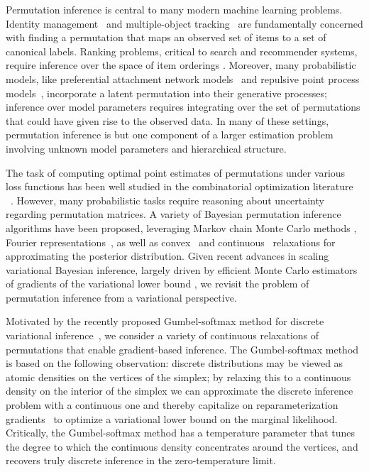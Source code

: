 \documentclass{article}
\begin{document}
Permutation inference is central to many modern machine learning
problems.  Identity management~\citep{guibas2008identity} and
multiple-object tracking~\citep{shin2005lazy, kondor2007multi} are
fundamentally concerned with finding a permutation that maps an
observed set of items to a set of canonical labels.
Ranking problems, critical to search and recommender systems, require
inference over the space of item orderings \citep{meilua2007consensus,
  lebanon2008non, adams2011ranking}.  Moreover, many probabilistic models, like
preferential attachment network models~\citep{bloem2016random} and
repulsive point process models~\citep{rao2016bayesian}, incorporate a
latent permutation into their generative processes; inference over
model parameters requires integrating over the set of permutations
that could have given rise to the observed data.  In many of these
settings, permutation inference is but one component of a larger
estimation problem involving unknown model parameters and hierarchical
structure.

The task of computing optimal point estimates of permutations under
various loss functions has been well studied
in the combinatorial optimization literature ~\citep{kuhn1955hungarian, munkres1957algorithms,
  lawler1963quadratic}. However, many probabilistic tasks require reasoning
about uncertainty regarding permutation matrices.  A variety of
Bayesian permutation inference algorithms have been proposed, leveraging
Markov chain Monte Carlo methods \citep{diaconis1988group}, Fourier
representations~\citep{kondor2007multi, huang2009fourier}, as well as
convex~\citep{lim2014beyond} and
continuous~\citep{plis2011directional} relaxations for approximating
the posterior distribution.  Given recent advances in scaling
variational Bayesian inference, largely driven by efficient Monte
Carlo estimators of gradients of the variational lower bound
\citep{Kingma2014, rezende2014stochastic}, we revisit the problem of
permutation inference from a variational perspective.

Motivated by the recently proposed Gumbel-softmax method for discrete
variational inference~\citep{jang2016categorical,
  maddison2016concrete}, we consider a variety of continuous
relaxations of permutations that enable gradient-based inference.  The
Gumbel-softmax method is based on the following observation: discrete
distributions may be viewed as atomic densities on the vertices of the
simplex; by relaxing this to a continuous density on the interior of
the simplex we can approximate the discrete inference problem with a
continuous one and thereby capitalize on reparameterization
gradients~\citep{Kingma2014, rezende2014stochastic} to optimize a
variational lower bound on the marginal likelihood.  Critically, the
Gumbel-softmax method has a temperature parameter that tunes the
degree to which the continuous density concentrates around the
vertices, and recovers truly discrete inference in the
zero-temperature limit.
\end{document}
